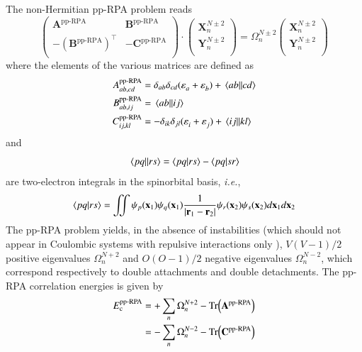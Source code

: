 \documentclass[aip,jcp,reprint,noshowkeys,superscriptaddress]{revtex4-1}
\newcommand{\ie}{\textit{i.e.}}
\newcommand{\T}[1]{#1^{\intercal}}
\newcommand{\br}{\mathbf{r}}
\newcommand{\bx}{\mathbf{x}}
\newcommand{\ppRPA}{\text{pp-RPA}}
\newcommand{\Ec}{E_\text{c}}
\newcommand{\e}[2]{\eps_{#1}^{#2}}
\newcommand{\Om}[2]{\Omega_{#1}^{#2}}
\newcommand{\SO}[1]{\psi_{#1}}
\newcommand{\bA}[2]{\mathbf{A}_{#1}^{#2}}
\newcommand{\bB}[2]{\mathbf{B}_{#1}^{#2}}
\newcommand{\bC}[2]{\mathbf{C}_{#1}^{#2}}
\newcommand{\bX}[2]{\mathbf{X}_{#1}^{#2}}
\newcommand{\bY}[2]{\mathbf{Y}_{#1}^{#2}}
\newcommand{\eps}{\varepsilon}
\begin{document}
The non-Hermitian pp-RPA problem reads \cite{Schuck_Book,vanAggelen_2013,Peng_2013,Scuseria_2013,Yang_2013,Yang_2013b,vanAggelen_2014,Yang_2014a,Zhang_2015,Zhang_2016}
\begin{equation}
\label{eq:LR-RPA}
	\begin{pmatrix}
		\bA{}{\ppRPA}			&	\bB{}{\ppRPA}	\\
		-\T{(\bB{}{\ppRPA})}	&	-\bC{}{\ppRPA}	\\
	\end{pmatrix}
	\cdot
	\begin{pmatrix}
		\bX{n}{N\pm2}	\\
		\bY{n}{N\pm2}	\\
	\end{pmatrix}
	=
	\Om{n}{N\pm2}
	\begin{pmatrix}
		\bX{n}{N\pm2}	\\
		\bY{n}{N\pm2}	\\
	\end{pmatrix}
\end{equation}
where the elements of the various matrices are defined as
\begin{subequations}
\begin{align}
	A_{ab,cd}^{\ppRPA} & = \delta_{ab} \delta_{cd} (\e{a}{} + \e{b}{}) + \mel{ab}{}{cd}
	\\ 
	B_{ab,ij}^{\ppRPA} & = \mel{ab}{}{ij}
	\\ 
	C_{ij,kl}^{\ppRPA} & = - \delta_{ik} \delta_{jl} (\e{i}{} + \e{j}{}) +\mel{ij}{}{kl}
\end{align}
\end{subequations}
and 
\begin{equation}
	\mel{pq}{}{rs} = \braket{pq}{rs} - \braket{pq}{sr}
\end{equation}
are two-electron integrals in the spinorbital basis, \ie,
\begin{equation}
	\braket{pq}{rs} = \iint \SO{p}(\bx_1) \SO{q}(\bx_1) \frac{1}{\abs{\br_1 - \br_2}} \SO{r}(\bx_2) \SO{s}(\bx_2)  d\bx_1 d\bx_2
\end{equation}
The pp-RPA problem yields, in the absence of instabilities (which should not appear in Coulombic systems with repulsive interactions only \cite{Scuseria_2013}), $V(V-1)/2$ positive eigenvalues $\Om{n}{N+2}$ and $O(O-1)/2$ negative eigenvalues $\Om{n}{N-2}$, which  correspond respectively to double attachments and double detachments.
The pp-RPA correlation energies is given by \cite{Peng_2013,Scuseria_2013}
\begin{equation}
\begin{split}
	\Ec^\ppRPA 
	& = + \sum_n \Om{n}{N+2} - \Tr(\bA{}{\ppRPA}) 
	\\
	& = - \sum_n \Om{n}{N-2} - \Tr(\bC{}{\ppRPA})
\end{split}
\end{equation}
\end{document}
